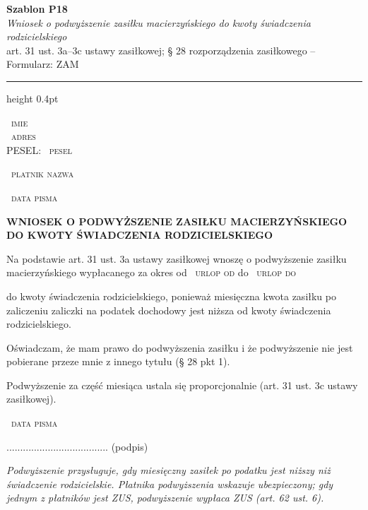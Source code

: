 \documentclass[11pt,a4paper]{article}
\newcommand{\Pole}[1]{%
  \textcolor{szary}{\dotfill}\,%
  {\scriptsize\textcolor{szary}{\textsc{#1}}}%
}
\newcommand{\NaglowekPisma}[1]{%
  \par\vspace{0.8em}%
  \begin{center}%
    {\large\bfseries\MakeUppercase{#1}}%
  \end{center}%
  \vspace{0.4em}%
}
\begin{document}
\begin{flushright}
{\footnotesize\color{szary}
\textbf{Szablon P18}\\
{\itshape Wniosek o podwyższenie zasiłku macierzyńskiego do kwoty świadczenia rodzicielskiego}\\
art. 31 ust. 3a--3c ustawy zasiłkowej; \S{} 28 rozporządzenia zasiłkowego -- Formularz: ZAM}\
\end{flushright}

\vspace{0.5em}
{\color{ramka}\hrule height 0.4pt}
\vspace{0.8em}

\Pole{imie}\\[-2pt]
\Pole{adres}\\[-2pt]
PESEL: \Pole{pesel}

\Pole{platnik nazwa}

\Pole{data pisma}

\NaglowekPisma{WNIOSEK O PODWYŻSZENIE ZASIŁKU MACIERZYŃSKIEGO DO KWOTY ŚWIADCZENIA RODZICIELSKIEGO}

Na podstawie art. 31 ust. 3a ustawy zasiłkowej wnoszę o podwyższenie
zasiłku macierzyńskiego wypłacanego za okres od \Pole{urlop od} do \Pole{urlop do}
do kwoty świadczenia rodzicielskiego, ponieważ miesięczna kwota zasiłku
po zaliczeniu zaliczki na podatek dochodowy jest niższa od kwoty
świadczenia rodzicielskiego.

Oświadczam, że mam prawo do podwyższenia zasiłku i że podwyższenie
nie jest pobierane przeze mnie z innego tytułu (\S{} 28 pkt 1).

Podwyższenie za część miesiąca ustala się proporcjonalnie
(art. 31 ust. 3c ustawy zasiłkowej).

\Pole{data pisma}
.....................................
(podpis)

\vfill
{\footnotesize\textcolor{szary}\itshape Podwyższenie przysługuje, gdy miesięczny zasiłek po podatku jest niższy niż świadczenie rodzicielskie. Płatnika podwyższenia wskazuje ubezpieczony; gdy jednym z płatników jest ZUS, podwyższenie wypłaca ZUS (art. 62 ust. 6). }
\end{document}
